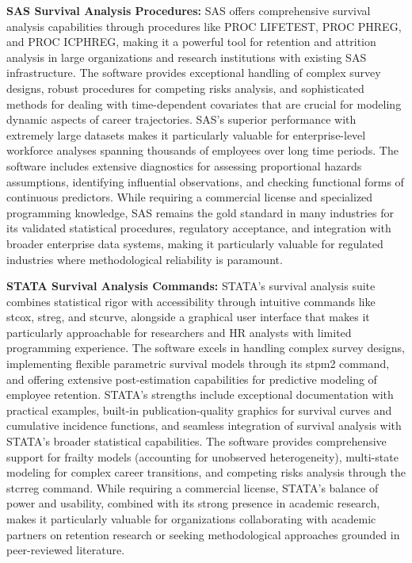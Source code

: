 \documentclass[
  letterpaper,
  DIV=11,
  numbers=noendperiod]{scrartcl}
\begin{document}
\textbf{SAS Survival Analysis Procedures:} SAS offers comprehensive
survival analysis capabilities through procedures like PROC LIFETEST,
PROC PHREG, and PROC ICPHREG, making it a powerful tool for retention
and attrition analysis in large organizations and research institutions
with existing SAS infrastructure. The software provides exceptional
handling of complex survey designs, robust procedures for competing
risks analysis, and sophisticated methods for dealing with
time-dependent covariates that are crucial for modeling dynamic aspects
of career trajectories. SAS's superior performance with extremely large
datasets makes it particularly valuable for enterprise-level workforce
analyses spanning thousands of employees over long time periods. The
software includes extensive diagnostics for assessing proportional
hazards assumptions, identifying influential observations, and checking
functional forms of continuous predictors. While requiring a commercial
license and specialized programming knowledge, SAS remains the gold
standard in many industries for its validated statistical procedures,
regulatory acceptance, and integration with broader enterprise data
systems, making it particularly valuable for regulated industries where
methodological reliability is paramount.

\textbf{STATA Survival Analysis Commands:} STATA's survival analysis
suite combines statistical rigor with accessibility through intuitive
commands like stcox, streg, and stcurve, alongside a graphical user
interface that makes it particularly approachable for researchers and HR
analysts with limited programming experience. The software excels in
handling complex survey designs, implementing flexible parametric
survival models through its stpm2 command, and offering extensive
post-estimation capabilities for predictive modeling of employee
retention. STATA's strengths include exceptional documentation with
practical examples, built-in publication-quality graphics for survival
curves and cumulative incidence functions, and seamless integration of
survival analysis with STATA's broader statistical capabilities. The
software provides comprehensive support for frailty models (accounting
for unobserved heterogeneity), multi-state modeling for complex career
transitions, and competing risks analysis through the stcrreg command.
While requiring a commercial license, STATA's balance of power and
usability, combined with its strong presence in academic research, makes
it particularly valuable for organizations collaborating with academic
partners on retention research or seeking methodological approaches
grounded in peer-reviewed literature.
\end{document}
